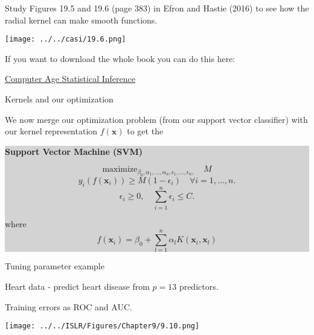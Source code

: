 \documentclass[10pt,ignorenonframetext,]{beamer}
\begin{document}
\begin{frame}

Study Figures 19.5 and 19.6 (page 383) in Efron and Hastie (2016) to see
how the radial kernel can make smooth functions.

\centering
\texttt{[image: ../../casi/19.6.png]}

\flushleft
\small

If you want to download the whole book you can do this here:

\href{https://web.stanford.edu/~hastie/CASI_files/PDF/casi.pdf}{Computer
Age Statistical Inference}

\end{frame}

\begin{frame}

\begin{block}{Kernels and our optimization}

\vspace{2mm}

We now merge our optimization problem (from our support vector
classifier) with our kernel representation \(f({\boldsymbol x})\) to get
the \vspace{2mms}

\colorbox{lightgray}{\begin{minipage}{10cm}
{\bf Support Vector Machine (SVM)}

$$\mathrm{maximize}_{\beta_0,\alpha_1,...,\alpha_n,\epsilon_1,...,\epsilon_n,} \quad M $$
$$y_i(f({\boldsymbol x}_i))\geq M(1-\epsilon_i) \quad  \forall i=1,...,n.$$
$$\epsilon_i\geq 0, \quad \sum_{i=1}^n \epsilon_i \leq C.$$

where 
$$f({\boldsymbol x}_i)=\beta_0 +\sum_{l=1}^n \alpha_l K({\boldsymbol x}_i,{\boldsymbol x}_l)$$
\end{minipage}}

\end{block}

\end{frame}

\begin{frame}

\begin{block}{Tuning parameter example}

Heart data - predict heart disease from \(p=13\) predictors.

Training errors as ROC and AUC.

\texttt{[image: ../../ISLR/Figures/Chapter9/9.10.png]}

\end{block}

\end{frame}
\end{document}

